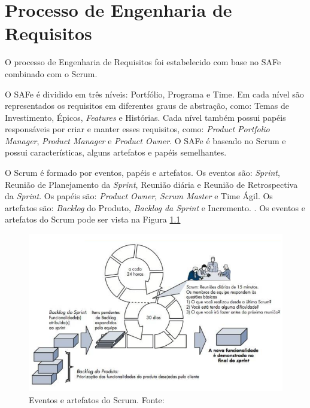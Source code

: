 \chapter[Processo de Engenharia de Requisitos]{Processo de Engenharia de Requisitos}

O processo de Engenharia de Requisitos foi estabelecido com base no SAFe combinado com o Scrum.

O SAFe é dividido em três níveis: Portfólio, Programa e Time. Em cada nível são representados os requisitos
em diferentes graus de abstração, como: Temas de Investimento, Épicos, \textit{Features} e Histórias.
Cada nível também possui papéis responsáveis por criar e manter esses requisitos, como: \textit{Product Portfolio Manager}, 
\textit{Product Manager} e \textit{Product Owner}. O SAFe é baseado no Scrum e
possui características, alguns artefatos e papéis semelhantes. \cite{safe}

% 

O Scrum é formado por eventos, papéis e artefatos. Os eventos são: \textit{Sprint}, Reunião de Planejamento
da \textit{Sprint}, Reunião diária e Reunião de Retrospectiva da \textit{Sprint}. Os papéis são: \textit{Product Owner},
\textit{Scrum Master} e Time Ágil. Os artefatos são: \textit{Backlog} do Produto, \textit{Backlog da Sprint} e Incremento. \cite{scrum}.
Os eventos e artefatos do Scrum pode ser vista na Figura \ref{fig:scrum}

\begin{figure}[!htb]
\centering
\includegraphics[scale=0.7]{figuras/scrum.png}
\caption{Eventos e artefatos do Scrum. Fonte: \cite{pressman}}
\label{fig:scrum}
\end{figure}


